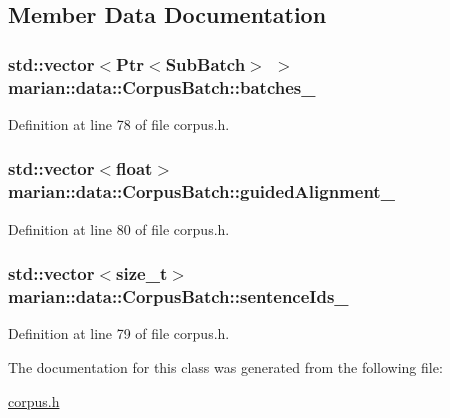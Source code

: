 \subsection{Member Data Documentation}
\subsubsection[{\texorpdfstring{batches\+\_\+}{batches_}}]{\setlength{\rightskip}{0pt plus 5cm}std\+::vector$<${\bf Ptr}$<${\bf Sub\+Batch}$>$ $>$ marian\+::data\+::\+Corpus\+Batch\+::batches\+\_\+\hspace{0.3cm}{\ttfamily [private]}}\hypertarget{classmarian_1_1data_1_1CorpusBatch_aa3cc50da7aef99ec7781f04b573151a7}{}\label{classmarian_1_1data_1_1CorpusBatch_aa3cc50da7aef99ec7781f04b573151a7}


Definition at line 78 of file corpus.\+h.

\subsubsection[{\texorpdfstring{guided\+Alignment\+\_\+}{guidedAlignment_}}]{\setlength{\rightskip}{0pt plus 5cm}std\+::vector$<$float$>$ marian\+::data\+::\+Corpus\+Batch\+::guided\+Alignment\+\_\+\hspace{0.3cm}{\ttfamily [private]}}\hypertarget{classmarian_1_1data_1_1CorpusBatch_aceb2c4385a9f2ead2ec2b919ec41afbb}{}\label{classmarian_1_1data_1_1CorpusBatch_aceb2c4385a9f2ead2ec2b919ec41afbb}


Definition at line 80 of file corpus.\+h.

\subsubsection[{\texorpdfstring{sentence\+Ids\+\_\+}{sentenceIds_}}]{\setlength{\rightskip}{0pt plus 5cm}std\+::vector$<$size\+\_\+t$>$ marian\+::data\+::\+Corpus\+Batch\+::sentence\+Ids\+\_\+\hspace{0.3cm}{\ttfamily [private]}}\hypertarget{classmarian_1_1data_1_1CorpusBatch_adb20ef88451d82c3c798b7d7e184d444}{}\label{classmarian_1_1data_1_1CorpusBatch_adb20ef88451d82c3c798b7d7e184d444}


Definition at line 79 of file corpus.\+h.



The documentation for this class was generated from the following file\+:\begin{DoxyCompactItemize}
\item 
\hyperlink{corpus_8h}{corpus.\+h}\end{DoxyCompactItemize}
